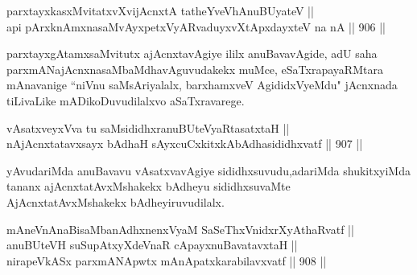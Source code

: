 \begin{shl}
parxtayxkasxMvitatxvXvijAcnxtA tatheYveVhAnuBUyateV || \\
api pArxknAmxnasaMvAyxpetxVyARvaduyxvXtApxdayxteV  na nA \hfill || 906 ||  
\end{shl}

\begin{artha}
parxtayxgAtamxsaMvitutx ajAcnxtavAgiye ililx anuBavavAgide, adU saha parxmANajAcnxnasaMbaMdhavAguvudakekx muMce, eSaTxrapayaRMtara mAnavanige ``niVnu saMsAriyalalx, barxhamxveV AgididxVyeMdu" jAcnxnada tiLivaLike mADikoDuvudilalxvo aSaTxravarege.
\end{artha}


\begin{shl}
vAsatxveyxVva tu saMsididhxranuBUteVyaRtasatxtaH || \\
nAjAcnxtatavxsayx bAdhaH sAyxcuCxkitxkAbAdhasididhxvatf \hfill || 907 ||  
\end{shl}

\begin{artha}
yAvudariMda anuBavavu vAsatxvavAgiye sididhxsuvudu,\break adariMda shukitxyiMda tananx ajAcnxtatAvxMshakekx bAdheyu sididhxsuvaMte AjAcnxtatAvxMshakekx bAdheyiruvudilalx.
\end{artha}

\begin{shl}
mAneVnAnaBisaMbanAdhxnenxVyaM SaSeThxVnidxrXyAthaRvatf || \\
anuBUteVH suSupAtxyXdeVnaR cApayxnuBavatavxtaH || \\
nirapeVkASx parxmANApwtx mAnApatxkarabilavxvatf \hfill || 908 ||  
\end{shl}

